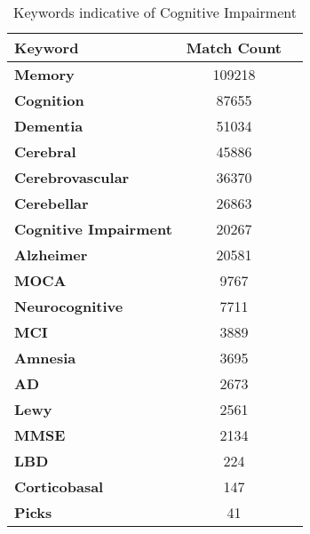 \documentclass{article}
\begin{document}
\begin{table}[hbtp] 
\floatconts

\centering
    \begin{tabular}{lcc}
        \toprule
        \bfseries Keyword & \bfseries Match Count \\
        \midrule
        
        \bfseries Memory & 109218 \\ 
        \bfseries Cognition & 87655 \\ 
        \bfseries Dementia & 51034 \\ 
        \bfseries Cerebral & 45886 \\ 
        \bfseries Cerebrovascular & 36370 \\ 
        \bfseries Cerebellar & 26863 \\
        \bfseries Cognitive Impairment & 20267 \\ 
        \bfseries Alzheimer & 20581 \\ 
        \bfseries MOCA & 9767 \\ 
        \bfseries Neurocognitive & 7711 \\ 
        \bfseries MCI & 3889 \\ 
        \bfseries Amnesia & 3695 \\ 
        \bfseries AD & 2673 \\ 
        \bfseries Lewy & 2561 \\ 
        \bfseries MMSE & 2134 \\ 
        \bfseries LBD & 224 \\ 
        \bfseries Corticobasal & 147 \\ 
        \bfseries Picks & 41 \\ 
        
        \bottomrule
        \end{tabular}
        {\caption{Keywords indicative of Cognitive Impairment}}
\end{table}
\end{document}
